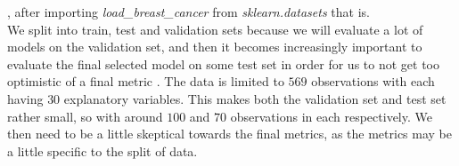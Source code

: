 \documentclass{article}
\begin{document}
, after importing \textit{load\_breast\_cancer} from \textit{sklearn.datasets}
\cite{sklearncancerdata} that is.
\\

We split into train, test and validation sets because we will evaluate a lot of
models on the validation set, and then it becomes increasingly important to
evaluate the final selected model on some test set in order for us to not get
too optimistic of a final metric \cite[s.~7.2]{hastie2009elements}.  The data is
limited to $569$ observations with each having $30$ explanatory variables. This
makes both the validation set and test set rather small, so with around $100$
and $70$ observations in each respectively. We then need to be a little
skeptical towards the final metrics, as the metrics may be a little specific to
the split of data.
\end{document}
